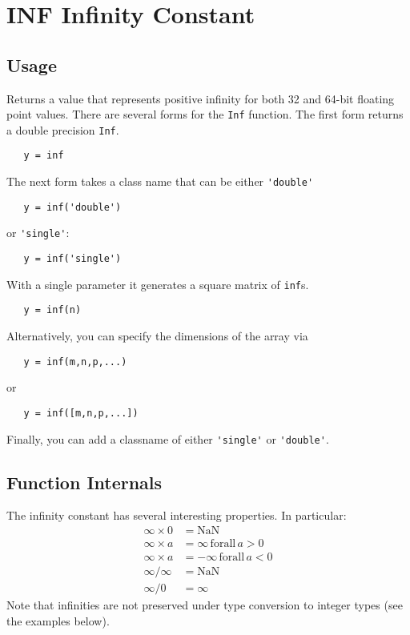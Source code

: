 \section{INF Infinity Constant}

\subsection{Usage}

Returns a value that represents positive infinity 
for both 32 and 64-bit floating point values. 
There are several forms for the \verb|Inf| function.
The first form returns a double precision \verb|Inf|.
\begin{verbatim}
   y = inf
\end{verbatim}
The next form takes a class name that can be either \verb|'double'| 
\begin{verbatim}
   y = inf('double')
\end{verbatim}
or \verb|'single'|:
\begin{verbatim}
   y = inf('single')
\end{verbatim}
With a single parameter it generates a square matrix of \verb|inf|s.
\begin{verbatim}
   y = inf(n)
\end{verbatim}
Alternatively, you can specify the dimensions of the array via
\begin{verbatim}
   y = inf(m,n,p,...)
\end{verbatim}
or
\begin{verbatim}
   y = inf([m,n,p,...])
\end{verbatim}
Finally, you can add a classname of either \verb|'single'| or \verb|'double'|.
\subsection{Function Internals}

The infinity constant has
several interesting properties.  In particular:
\[
\begin{array}{ll}
   \infty \times 0 & = \mathrm{NaN} \\                                             \infty \times a & = \infty \, \mathrm{for all} \, a > 0 \\   \infty \times a & = -\infty \, \mathrm{for all} \, a < 0 \\   \infty / \infty & = \mathrm{NaN} \\   \infty / 0 & = \infty 
\end{array}
\]
Note that infinities are not preserved under type conversion to integer types (see the examples below).
